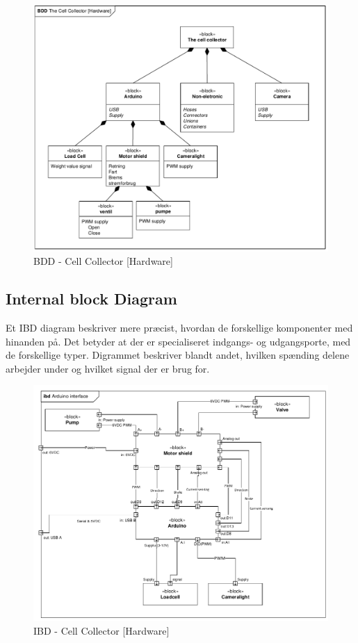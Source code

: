 \begin{figure}[H]
	\centering
	\includegraphics[width=1\textwidth]{pdf/BDD_Hardware_4315_cropped.pdf}
	\caption{BDD - Cell Collector [Hardware]}
	\label{fig:bdd_Hardware}
\end{figure}

\newpage
\subsection{Internal block Diagram} 
Et IBD diagram beskriver mere præcist, hvordan de forskellige komponenter med hinanden på. Det betyder at der er specialiseret indgangs- og udgangsporte, med de forskellige typer. Digrammet beskriver blandt andet, hvilken spænding delene arbejder under og hvilket signal der er brug for.


\begin{figure}[H]
	\centering
	\includegraphics[width=1\textwidth]{pdf/IBD_Hardware(Arduino)_cropped.pdf}
	\caption{IBD - Cell Collector [Hardware]}
	\label{fig:ibd_Hardware}
\end{figure}

